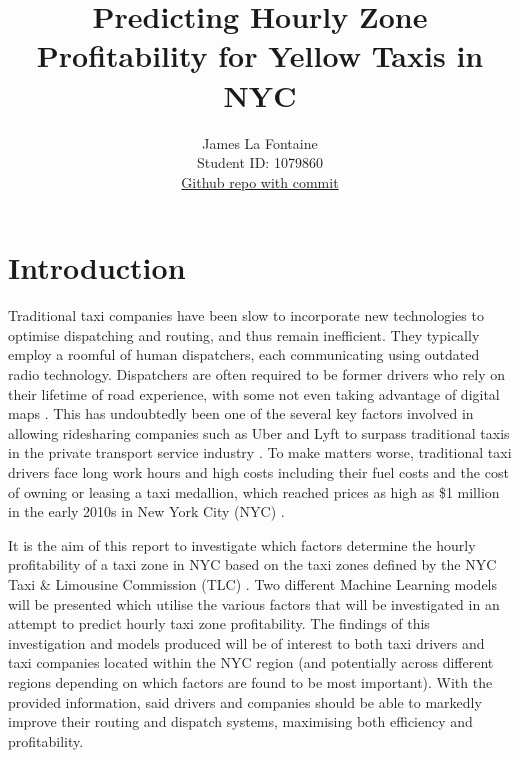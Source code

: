 \documentclass[11pt]{article}
\title{\textbf{Predicting Hourly Zone Profitability for Yellow Taxis in NYC}}
\author{
James La Fontaine \\
Student ID: 1079860 \\
\href{INSERT GITHUB REPO HERE i.e https://github.com/MAST30034-Applied-Data-Science/mast30034-project-1-jameslafontaine}{Github repo with commit}
}
\begin{document}
\maketitle

\section{Introduction}

Traditional taxi companies have been slow to incorporate new technologies to optimise dispatching and routing, and thus remain inefficient.  They typically employ a roomful of human dispatchers, each communicating using outdated radio technology. Dispatchers are often required to be former drivers who rely on their lifetime of road experience, with some not even taking advantage of digital maps \cite{routingInefficiency}. This has undoubtedly been one of the several key factors involved in allowing ridesharing companies such as Uber and Lyft to surpass traditional taxis in the private transport service industry \cite{taxiVsUber}. To make matters worse, traditional taxi drivers face long work hours and high costs including their fuel costs and the cost of owning or leasing a taxi medallion, which reached prices as high as \$1 million in the early 2010s in New York City (NYC) \cite{taxiVsUber}.

It is the aim of this report to investigate which factors determine the hourly profitability of a taxi zone in NYC based on the taxi zones defined by the NYC Taxi \& Limousine Commission (TLC) \cite{taxizones}. Two different Machine Learning models will be presented which utilise the various factors that will be investigated in an attempt to predict hourly taxi zone profitability. The findings of this investigation and models produced will be of interest to both taxi drivers and taxi companies located within the NYC region (and potentially across different regions depending on which factors are found to be most important). With the provided information, said drivers and companies should be able to markedly improve their routing and dispatch systems, maximising both efficiency and profitability.
\end{document}
